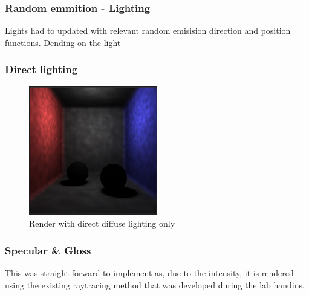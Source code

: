 \documentclass{article}
\begin{document}
\subsubsection{Random emmition - Lighting}
Lights had to updated with relevant random emisision direction and position functions. Dending on the light 

\subsubsection{Direct lighting}
\begin{figure}[h]
\includegraphics[width=0.5\textwidth]{direct_diffuse}
\caption{Render with direct diffuse lighting only}
\label{fig:direct_diffuse}
\end{figure}

\subsubsection{Specular \& Gloss}
This was straight forward to implement as, due to the intensity, it is rendered using the existing raytracing method that was developed during the lab handins.
\end{document}
